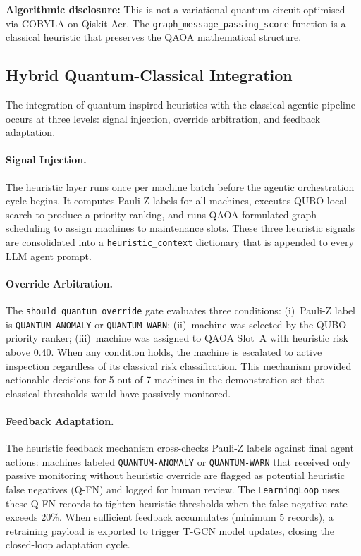 \textbf{Algorithmic disclosure:} This is not a variational quantum circuit optimised via COBYLA on Qiskit Aer. The \texttt{graph\_message\_passing\_score} function is a classical heuristic that preserves the QAOA mathematical structure.

\subsection{Hybrid Quantum-Classical Integration}

The integration of quantum-inspired heuristics with the classical agentic pipeline occurs at three levels: signal injection, override arbitration, and feedback adaptation.

\paragraph{Signal Injection.} The heuristic layer runs once per machine batch before the agentic orchestration cycle begins. It computes Pauli-Z labels for all machines, executes QUBO local search to produce a priority ranking, and runs QAOA-formulated graph scheduling to assign machines to maintenance slots. These three heuristic signals are consolidated into a \texttt{heuristic\_context} dictionary that is appended to every LLM agent prompt.

\paragraph{Override Arbitration.} The \texttt{should\_quantum\_override} gate evaluates three conditions: (i)~Pauli-Z label is \texttt{QUANTUM-ANOMALY} or \texttt{QUANTUM-WARN}; (ii)~machine was selected by the QUBO priority ranker; (iii)~machine was assigned to QAOA Slot~A with heuristic risk above 0.40. When any condition holds, the machine is escalated to active inspection regardless of its classical risk classification. This mechanism provided actionable decisions for 5 out of 7 machines in the demonstration set that classical thresholds would have passively monitored.

\paragraph{Feedback Adaptation.} The heuristic feedback mechanism cross-checks Pauli-Z labels against final agent actions: machines labeled \texttt{QUANTUM-ANOMALY} or \texttt{QUANTUM-WARN} that received only passive monitoring without heuristic override are flagged as potential heuristic false negatives (Q-FN) and logged for human review. The \texttt{LearningLoop} uses these Q-FN records to tighten heuristic thresholds when the false negative rate exceeds 20\%. When sufficient feedback accumulates (minimum 5 records), a retraining payload is exported to trigger T-GCN model updates, closing the closed-loop adaptation cycle.

